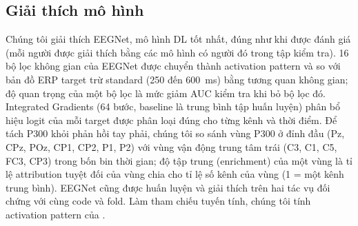 \subsection{Giải thích mô hình}
\label{sec:explain-methods}
Chúng tôi giải thích EEGNet, mô hình DL tốt nhất, đúng như khi được đánh giá (mỗi người được giải thích bằng các mô hình có người đó trong tập kiểm tra). 16 bộ lọc không gian của EEGNet được chuyển thành activation pattern \citep{haufe2014} và so với bản đồ ERP target trừ standard (250 đến 600~ms) bằng tương quan không gian; độ quan trọng của một bộ lọc là mức giảm AUC kiểm tra khi bỏ bộ lọc đó. Integrated Gradients \citep{sundararajan2017} (64 bước, baseline là trung bình tập huấn luyện) phân bổ hiệu logit của mỗi target được phân loại đúng cho từng kênh và thời điểm. Để tách P300 khỏi phản hồi tay phải, chúng tôi so sánh vùng P300 ở đỉnh đầu (Pz, CPz, POz, CP1, CP2, P1, P2) với vùng vận động trung tâm trái (C3, C1, C5, FC3, CP3) trong bốn bin thời gian; độ tập trung (enrichment) của một vùng là tỉ lệ attribution tuyệt đối của vùng chia cho tỉ lệ số kênh của vùng (1 = một kênh trung bình). EEGNet cũng được huấn luyện và giải thích trên hai tác vụ đối chứng với cùng code và fold. Làm tham chiếu tuyến tính, chúng tôi tính activation pattern của .
